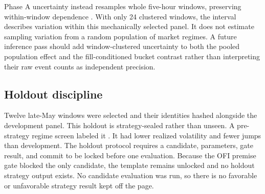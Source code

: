 Phase A uncertainty instead resamples whole five-hour windows, preserving
within-window dependence \citep{efron1979}. With only 24 clustered windows,
the interval describes variation within this mechanically selected panel. It
does not estimate sampling variation from a random population of market
regimes. A
future inference pass should add window-clustered uncertainty to both the pooled
population effect and the fill-conditioned bucket contrast rather than
interpreting their raw event counts as independent precision.

\subsection{Holdout discipline}

Twelve late-May windows were selected and their identities hashed alongside
the development panel. This holdout is strategy-sealed rather than unseen. A
pre-strategy regime screen labeled it
. It had lower realized volatility and fewer jumps than
development. The holdout protocol requires a candidate, parameters, gate
result, and commit to be locked before one evaluation. Because the OFI premise
gate blocked the only candidate, the template remains unlocked and no holdout
strategy output exists. No candidate evaluation was run, so there is no favorable
or unfavorable strategy result kept off the page.
